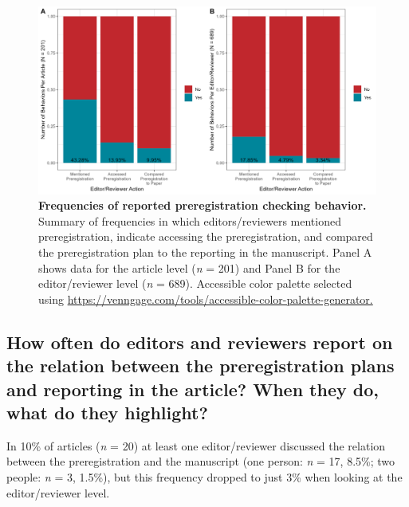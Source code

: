 \documentclass[authordate, meta]{jote-new-article}
\begin{document}
	\begin{figure}
		\includegraphics[width=\textwidth]{media/image2.png}

		\caption{\textbf{Frequencies of reported preregistration checking behavior.}\emph{ }Summary of frequencies in which editors/reviewers mentioned preregistration, indicate accessing the preregistration, and compared the preregistration plan to the reporting in the manuscript. Panel A shows data for the article level (\emph{n} = 201) and Panel B for the editor/reviewer level (\emph{n} = 689). Accessible color palette selected using \url{https://venngage.com/tools/accessible-color-palette-generator.}}

		\label{fig:rId11}


	\end{figure}

	\subsection{How often do editors and reviewers report on the relation between the preregistration plans and reporting in the article? When they do, what do they highlight?}



	In 10\% of articles (\emph{n} = 20) at least one editor/reviewer discussed the relation between the preregistration and the manuscript (one person: \emph{n} = 17, 8.5\%; two people: \emph{n} = 3, 1.5\%), but this frequency dropped to just 3\% when looking at the editor/reviewer level.
\end{document}
